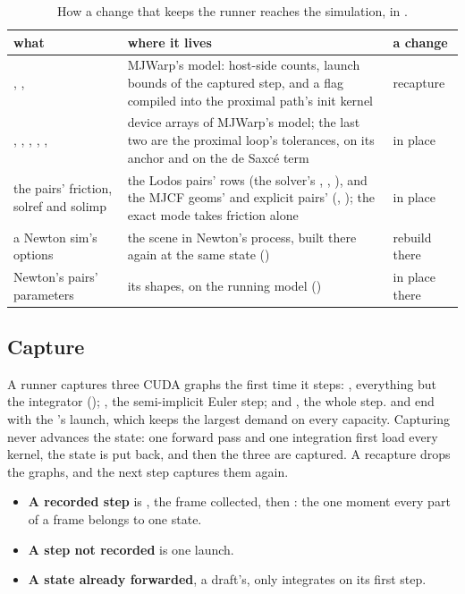 \begin{table}[t]
\centering
\caption{How a change that keeps the runner reaches the simulation, in .}
\label{tab:apply}
\small
\begin{tabularx}{\linewidth}{@{}L{48mm}YL{22mm}@{}}
\toprule
what & where it lives & a change \\
\midrule
{}, ,  & MJWarp's model: host-side counts, launch bounds of the captured step, and a flag compiled into the proximal path's init kernel & recapture \\
, , , , ,  & device arrays of MJWarp's model; the last two are the proximal loop's tolerances, on its anchor and on the de Saxcé term & in place \\
the pairs' friction, solref and solimp & the Lodos pairs' rows (the solver's , , ), and the MJCF geoms' and explicit pairs' (, ); the exact mode takes friction alone & in place \\
a Newton sim's options & the scene in Newton's process, built there again at the same state () & rebuild there \\
Newton's pairs' parameters & its shapes, on the running model () & in place there \\
\bottomrule
\end{tabularx}
\end{table}

\subsection{Capture}\label{sec:capture}

A runner captures three CUDA graphs the first time it steps: , everything but the integrator (); , the semi-implicit Euler step; and , the whole step.  and  end with the 's launch, which keeps the largest demand on every capacity. Capturing never advances the state: one forward pass and one integration first load every kernel, the state is put back, and then the three are captured. A recapture drops the graphs, and the next step captures them again.

\begin{itemize}
\item \textbf{A recorded step} is , the frame collected, then : the one moment every part of a frame belongs to one state.
\item \textbf{A step not recorded} is one  launch.
\item \textbf{A state already forwarded}, a draft's, only integrates on its first step.
\end{itemize}

